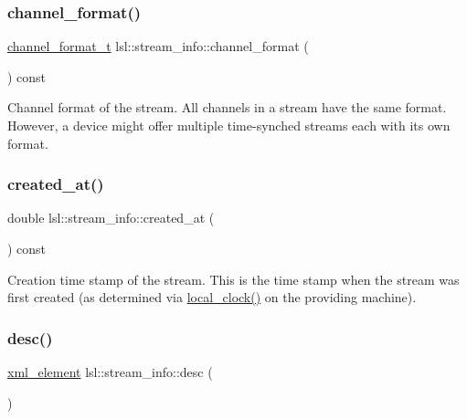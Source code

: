 \subsubsection{\texorpdfstring{channel\+\_\+format()}{channel\_format()}}
{\footnotesize\ttfamily \hyperlink{namespacelsl_a28d50dae6fd82eea8893ce3d63ccd46c}{channel\+\_\+format\+\_\+t} lsl\+::stream\+\_\+info\+::channel\+\_\+format (\begin{DoxyParamCaption}{ }\end{DoxyParamCaption}) const\hspace{0.3cm}{\ttfamily [inline]}}

Channel format of the stream. All channels in a stream have the same format. However, a device might offer multiple time-\/synched streams each with its own format. \mbox{\label{classlsl_1_1stream__info_a9a5be16db42c09b1f0cced52a2259db8}} 
\subsubsection{\texorpdfstring{created\+\_\+at()}{created\_at()}}
{\footnotesize\ttfamily double lsl\+::stream\+\_\+info\+::created\+\_\+at (\begin{DoxyParamCaption}{ }\end{DoxyParamCaption}) const\hspace{0.3cm}{\ttfamily [inline]}}

Creation time stamp of the stream. This is the time stamp when the stream was first created (as determined via \hyperlink{namespacelsl_ae1766ae2ab66141cb927612e57a0c8c6}{local\+\_\+clock()} on the providing machine). \mbox{\label{classlsl_1_1stream__info_a7bbc53bb041757eb87c6c73564981390}} 
\subsubsection{\texorpdfstring{desc()}{desc()}}
{\footnotesize\ttfamily \hyperlink{classlsl_1_1xml__element}{xml\+\_\+element} lsl\+::stream\+\_\+info\+::desc (\begin{DoxyParamCaption}{ }\end{DoxyParamCaption})\hspace{0.3cm}{\ttfamily [inline]}}

